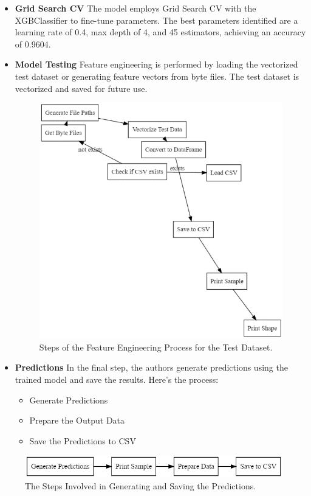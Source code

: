 \documentclass[conference]{IEEEtran}
\begin{document}
\begin{itemize}
    \item \textbf{Grid Search CV}
    The model employs Grid Search CV with the XGBClassifier to fine-tune parameters. The best parameters identified are a learning rate of 0.4, max depth of 4, and 45 estimators, achieving an accuracy of 0.9604.
    \item \textbf{Model Testing}
    Feature engineering is performed by loading the vectorized test dataset or generating feature vectors from byte files. The test dataset is vectorized and saved for future use.
    \begin{figure}[H]
        \centerline{\includegraphics[width=\linewidth]{fig15}}
        \caption{Steps of the Feature Engineering Process for the Test Dataset.}
        \label{fig15}
    \end{figure}

    \item \textbf{Predictions}
    In the final step, the authors generate predictions using the trained model and save the results. Here's the process:
    \begin{itemize}
        \item Generate Predictions
        \item Prepare the Output Data
        \item Save the Predictions to CSV
    \end{itemize}
\end{itemize}
\begin{figure}[H]
    \centerline{\includegraphics[width=\linewidth]{fig16}}
    \caption{The Steps Involved in Generating and Saving the Predictions.}
    \label{fig16}
\end{figure}
\end{document}
